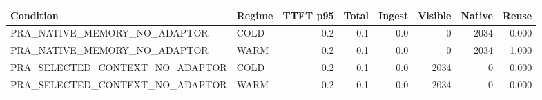 \begin{tabular}{llrrrrrr}
\toprule
Condition & Regime & TTFT p95 & Total & Ingest & Visible & Native & Reuse \\
\midrule
PRA\_NATIVE\_MEMORY\_NO\_ADAPTOR & COLD & 0.2 & 0.1 & 0.0 & 0 & 2034 & 0.000 \\
PRA\_NATIVE\_MEMORY\_NO\_ADAPTOR & WARM & 0.2 & 0.1 & 0.0 & 0 & 2034 & 1.000 \\
PRA\_SELECTED\_CONTEXT\_NO\_ADAPTOR & COLD & 0.2 & 0.1 & 0.0 & 2034 & 0 & 0.000 \\
PRA\_SELECTED\_CONTEXT\_NO\_ADAPTOR & WARM & 0.2 & 0.1 & 0.0 & 2034 & 0 & 0.000 \\
\bottomrule
\end{tabular}

